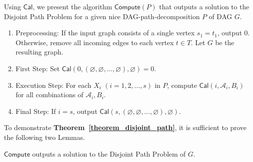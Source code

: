 \documentclass[runningheads]{llncs}
\theoremstyle{plain}
\theoremstyle{definition}
\begin{document}
Using $\mathsf{Cal}$, we present the algorithm $\mathsf{Compute}(P)$ that outputs a solution to the Disjoint Path Problem for a given nice DAG-path-decomposition $P$ of DAG $G$.

\begin{enumerate}
    \item Preprocessing: If the input graph consists of a single vertex $s_1 = t_1$, output 0. Otherwise, remove all incoming edges to each vertex $t \in T$. Let $G$ be the resulting graph.
    \item First Step: Set $\mathsf{Cal}(0, (\varnothing, \varnothing, \dots, \varnothing), \varnothing) = 0$.
    \item Execution Step: For each $X_i$ $(i=1, 2, \dots, s)$ in $P$, compute $\mathsf{Cal}(i, \mathscr{A}_i, B_i)$ for all combinations of $\mathscr{A}_i, B_i$.
    \item Final Step: If $i = s$, output $\mathsf{Cal}(s, (\varnothing, \varnothing, \dots, \varnothing), \varnothing)$.
\end{enumerate}


To demonstrate \textbf{Theorem~\ref{theorem_disjoint_path}}, it is sufficient to prove the following two Lemmas.

\begin{lemma}\label{dpp}
    $\mathsf{Compute}$ outputs a solution to the Disjoint Path Problem of $G$.
\end{lemma}
\end{document}
